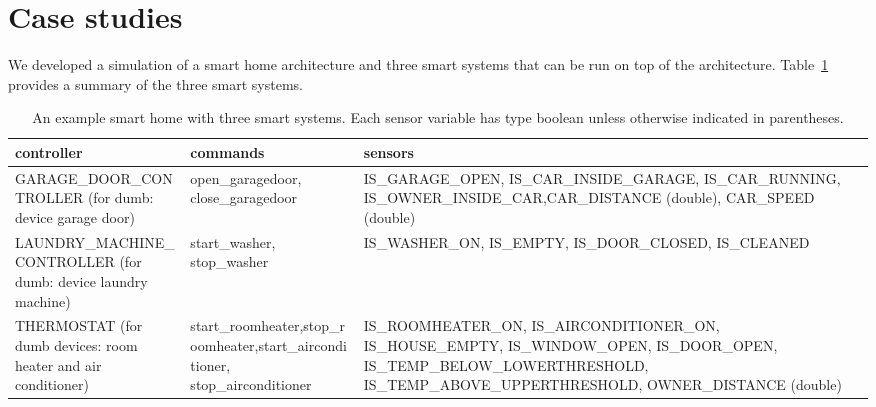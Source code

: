 \documentclass{article}
\begin{document}
\section{Case studies}
\label{benchmarks}
We developed a simulation of a smart home architecture and three smart systems that can be run on top of the architecture. Table~\ref{table:appliance_sensor} provides a summary of the three smart systems. 

\begin{table}[h]
\begin{center}
\begin{tabular}{|p{4cm}|p{6cm}|p{4.5cm}|}
\hline
controller & commands & sensors \\ \hline
\tiny{GARAGE\_DOOR\_CONTROLLER} \tiny{(for dumb: device garage door)} & 
\small{open\_garagedoor, close\_garagedoor}\tiny &  
\tiny{IS\_GARAGE\_OPEN, \newline IS\_CAR\_INSIDE\_GARAGE, \newline IS\_CAR\_RUNNING, \newline IS\_OWNER\_INSIDE\_CAR,\newline CAR\_DISTANCE (double), \newline CAR\_SPEED (double)} \\ \hline

\tiny{LAUNDRY\_MACHINE\_CONTROLLER} \tiny{ (for dumb: device laundry machine)} &
\small start\_washer, \small stop\_washer & 
\tiny{IS\_WASHER\_ON}, \newline \tiny{IS\_EMPTY, \newline IS\_DOOR\_CLOSED, \newline IS\_CLEANED} \\ \hline

\tiny{THERMOSTAT} \tiny{(for dumb devices: room heater and air conditioner)} & 
\small start\_roomheater,\newline \small stop\_roomheater,\newline\small start\_airconditioner, \newline \small stop\_airconditioner & 
\tiny{IS\_ROOMHEATER\_ON}, \tiny{IS\_AIRCONDITIONER\_ON},
\tiny{IS\_HOUSE\_EMPTY, \newline IS\_WINDOW\_OPEN, \newline IS\_DOOR\_OPEN, IS\_TEMP\_BELOW\_LOWERTHRESHOLD, IS\_TEMP\_ABOVE\_UPPERTHRESHOLD}, \tiny{OWNER\_DISTANCE (double)}\\ \hline
\end{tabular}
\caption{\small{An example smart home with three smart systems. Each sensor variable has type boolean unless otherwise indicated in parentheses.}}
\label{table:appliance_sensor}
\end{center}
\end{table}
\end{document}
